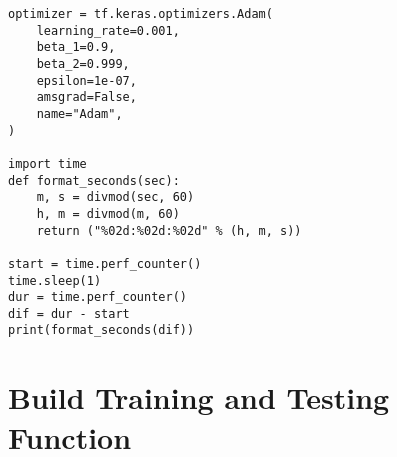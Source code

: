 \begin{verbatim}
optimizer = tf.keras.optimizers.Adam(
    learning_rate=0.001,
    beta_1=0.9,
    beta_2=0.999,
    epsilon=1e-07,
    amsgrad=False,
    name="Adam",
)

import time
def format_seconds(sec):
    m, s = divmod(sec, 60)
    h, m = divmod(m, 60)
    return ("%02d:%02d:%02d" % (h, m, s))

start = time.perf_counter()
time.sleep(1)
dur = time.perf_counter()
dif = dur - start
print(format_seconds(dif))
\end{verbatim}


\section{Build Training and Testing Function}

